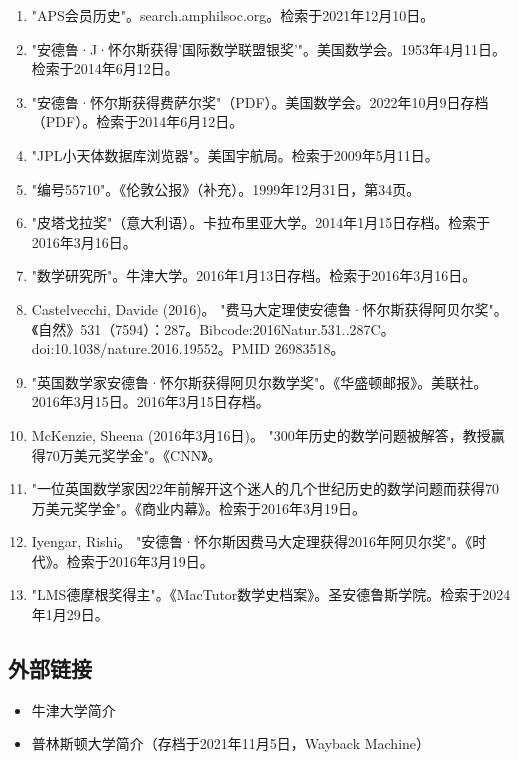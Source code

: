 \begin{enumerate}
\item "APS会员历史"。search.amphilsoc.org。检索于2021年12月10日。  
\item "安德鲁·J·怀尔斯获得'国际数学联盟银奖'"。美国数学会。1953年4月11日。检索于2014年6月12日。  
\item "安德鲁·怀尔斯获得费萨尔奖"（PDF）。美国数学会。2022年10月9日存档（PDF）。检索于2014年6月12日。  
\item "JPL小天体数据库浏览器"。美国宇航局。检索于2009年5月11日。  
\item "编号55710"。《伦敦公报》（补充）。1999年12月31日，第34页。  
\item "皮塔戈拉奖"（意大利语）。卡拉布里亚大学。2014年1月15日存档。检索于2016年3月16日。  
\item "数学研究所"。牛津大学。2016年1月13日存档。检索于2016年3月16日。  
\item Castelvecchi, Davide (2016)。 "费马大定理使安德鲁·怀尔斯获得阿贝尔奖"。《自然》531（7594）：287。Bibcode:2016Natur.531..287C。doi:10.1038/nature.2016.19552。PMID 26983518。  
\item "英国数学家安德鲁·怀尔斯获得阿贝尔数学奖"。《华盛顿邮报》。美联社。2016年3月15日。2016年3月15日存档。  
\item McKenzie, Sheena (2016年3月16日)。 "300年历史的数学问题被解答，教授赢得70万美元奖学金"。《CNN》。  
\item "一位英国数学家因22年前解开这个迷人的几个世纪历史的数学问题而获得70万美元奖学金"。《商业内幕》。检索于2016年3月19日。  
\item Iyengar, Rishi。 "安德鲁·怀尔斯因费马大定理获得2016年阿贝尔奖"。《时代》。检索于2016年3月19日。  
\item "LMS德摩根奖得主"。《MacTutor数学史档案》。圣安德鲁斯学院。检索于2024年1月29日。
\end{enumerate}
\subsection{外部链接}
\begin{itemize}
\item 牛津大学简介  
\item 普林斯顿大学简介（存档于2021年11月5日，Wayback Machine）  
\end{itemize}